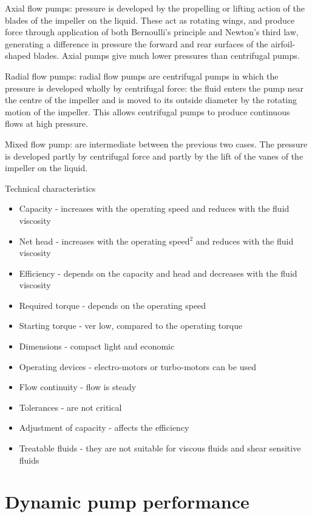 \documentclass[class=report, crop=false, 12pt,a4paper]{standalone}
\begin{document}
Axial flow pumps: pressure is developed by the propelling or lifting action of the blades of the impeller on the liquid. These act as rotating wings, and produce force through application of both Bernoulli's principle and Newton's third law, generating a difference in pressure the forward and rear surfaces of the airfoil-shaped blades. Axial pumps give much lower pressures than centrifugal pumps.

Radial flow pumps: radial flow pumps are centrifugal pumps in which the pressure is developed wholly by centrifugal force: the fluid enters the pump near the centre of the impeller and is moved to its outside diameter by the rotating motion of the impeller. This allows centrifugal pumps to produce continuous flows at high pressure. 

Mixed flow pump: are intermediate between the previous two cases. The pressure is developed partly by centrifugal force and partly by the lift of the vanes of the impeller on the liquid. 

Technical characteristics
\begin{itemize}
  \item Capacity - increases with the operating speed and reduces with the fluid viscosity
  \item Net head - increases with the operating speed$^2$ and reduces with the fluid viscosity
  \item Efficiency - depends on the capacity and head and decreases with the fluid viscosity
  \item Required torque - depends on the operating speed
  \item Starting torque - ver low, compared to the operating torque
  \item Dimensions - compact light and economic
  \item Operating devices - electro-motors or turbo-motors can be used
  \item Flow continuity - flow is steady
  \item Tolerances - are not critical
  \item Adjustment of capacity - affects the efficiency
  \item Treatable fluids - they are not suitable for viscous fluids and shear sensitive fluids
\end{itemize}
\section{Dynamic pump performance}
\end{document}
